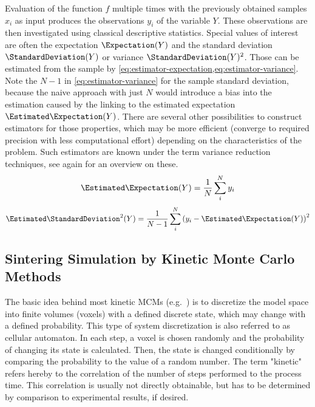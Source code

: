 Evaluation of the function $f$ multiple times with the previously obtained samples $x_i$ as input produces the observations $y_i$ of the variable $Y$.
These observations are then investigated using classical descriptive statistics.
Special values of interest are often the expectation $\Expectation(Y)$ and the standard deviation $\StandardDeviation(Y)$ or variance $\StandardDeviation(Y)^2$.
Those can be estimated from the sample by \cref{eq:estimator-expectation,eq:estimator-variance}.
Note the $N-1$ in \cref{eq:estimator-variance} for the sample standard deviation, because the naive approach with just $N$ would introduce a bias into the estimation caused by the linking to the estimated expectation $\Estimated\Expectation(Y)$.
There are several other possibilities to construct estimators for those properties, which may be more efficient (converge to required precision with less computational effort) depending on the characteristics of the problem.
Such estimators are known under the term variance reduction techniques, see again \textcite{Lemieux2009} for an overview on these.
\begin{equation}
    \Estimated\Expectation(Y) = \frac{1}{N} \sum_i^N y_i
    \label{eq:estimator-expectation}
\end{equation}
\begin{equation}
    \Estimated\StandardDeviation^2(Y) = \frac{1}{N-1} \sum_i^N \left( y_i - \Estimated\Expectation(Y) \right)^2
    \label{eq:estimator-variance}
\end{equation}

\subsection{Sintering Simulation by Kinetic Monte Carlo Methods}\label{subsec:monte-carlo-kinetic-sintering}

The basic idea behind most kinetic \glspl{MCM} (e.g.~\cite{Braginsky2005, Luque2010, Tikare2003, Wang2018, Bjork2012}) is to discretize the model space into finite volumes (voxels) with a defined discrete state, which may change with a defined probability.
This type of system discretization is also referred to as cellular automaton.
In each step, a voxel is chosen randomly and the probability of changing its state is calculated.
Then, the state is changed conditionally by comparing the probability to the value of a random number.
The term "kinetic" refers hereby to the correlation of the number of steps performed to the process time.
This correlation is usually not directly obtainable, but has to be determined by comparison to experimental results, if desired.

